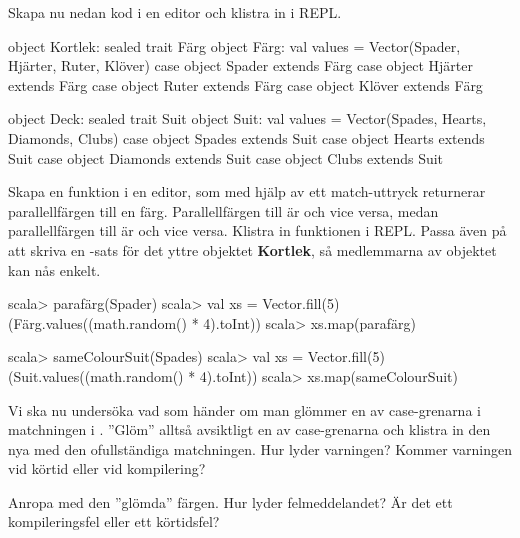 \Subtask  \label{subtask:match-sealedtrait-caseobject}
Skapa nu nedan kod i en editor och klistra in i REPL.
\ifswedish
\begin{Code}
object Kortlek:
  sealed trait Färg
  object Färg:
      val values = Vector(Spader, Hjärter, Ruter, Klöver)
  case object Spader extends Färg
  case object Hjärter extends Färg
  case object Ruter extends Färg
  case object Klöver extends Färg
\end{Code}
\else
\begin{Code}
object Deck:
  sealed trait Suit
  object Suit:
      val values = Vector(Spades, Hearts, Diamonds, Clubs)
  case object Spades extends Suit
  case object Hearts extends Suit
  case object Diamonds extends Suit
  case object Clubs extends Suit
\end{Code}
\fi

\Subtask \label{subtask:match-sealedtrait-function}
Skapa en funktion \ifswedish{}\else{}\fi{} i en editor, som med hjälp av ett match-uttryck returnerar parallellfärgen till en färg. Parallellfärgen till \ifswedish{}\else{}\fi{} är \ifswedish{}\else{}\fi{} och vice versa, medan parallellfärgen till \ifswedish{}\else{}\fi{} är \ifswedish{}\else{}\fi{} och vice versa. Klistra in funktionen i REPL. Passa även på att skriva en -sats för det yttre objektet \textbf{Kortlek}, så medlemmarna av objektet kan nås enkelt.
\ifswedish
\begin{REPL}
scala> parafärg(Spader)
scala> val xs = Vector.fill(5)(Färg.values((math.random() * 4).toInt))
scala> xs.map(parafärg)
\end{REPL}
\else
\begin{REPL}
scala> sameColourSuit(Spades)
scala> val xs = Vector.fill(5)(Suit.values((math.random() * 4).toInt))
scala> xs.map(sameColourSuit)
\end{REPL}
\fi

\Subtask \label{subtask:match-forgetcase}
Vi ska nu undersöka vad som händer om man glömmer en av case-grenarna i matchningen i \ifswedish{}\else{}\fi. ''Glöm'' alltså avsiktligt en av case-grenarna och klistra in den nya \ifswedish{}\else{}\fi{} med den ofullständiga matchningen. Hur lyder varningen? Kommer varningen vid körtid eller vid kompilering?

\Subtask Anropa \ifswedish{}\else{}\fi{} med den ''glömda'' färgen. Hur lyder felmeddelandet? Är det ett kompileringsfel eller ett körtidsfel?


